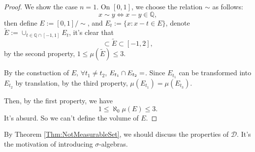 \begin{proof}
    We show the case $n=1$. 
    On $[0,1]$, we choose the relation $\sim$ as follows:
    \begin{displaymath}
        x\sim y\Leftrightarrow x-y\in\mathbb{Q},
    \end{displaymath}
    then define $E:=[0,1]/\sim$, and $E_{t}:=\{x:x-t\in E\}$, 
    denote $\tilde{E}:=\cup_{t\in\mathbb{Q}\cap[-1,1]}E_{t}$, 
    it's clear that 
    \begin{displaymath}
        [0,1]\subset\tilde{E}\subset[-1,2],
    \end{displaymath}
    by the second property, $1\le\mu(\tilde{E})\le 3$.

    By the constuction of $E$, $\forall t_{1}\neq t_2$, 
    $E_{t_1}\cap E_{t_2}=\empty$. 
    Since $E_{t_1}$ can be transformed into $E_{t_2}$ by translation, 
    by the third property, $\mu(E_{t_1})=\mu(E_{t_3})$.

    Then, by the first property, we have 
    \begin{displaymath}
        1\le\aleph_{0}\mu(E)\le 3.
    \end{displaymath}
    It's absurd. So we can't define the volume of $E$.
\end{proof}
\begin{rem}
    By Theorem \ref{Thm:NotMeasurableSet}, 
    we should discuss the properties of $\mathcal{D}$. 
    It's the motivation of introducing 
    $\sigma$-algebras.
\end{rem}
